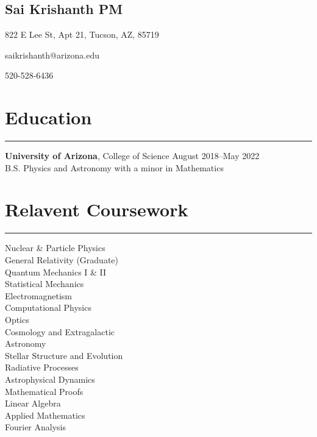 \documentclass[11pt]{article}
\newcommand{\name}[1]{\begin{center}\section*{\huge #1}\end{center}}
\newcommand{\topinfo}[1]{\begin{center}\vspace{-0.2cm}#1\vspace{-0.2cm}\end{center}}
\newcommand{\resumesection}[1]{\vspace{-0.2cm}\section*{#1}\vspace{-0.2cm}\hrule\vspace{0.2cm}}
\begin{document}
\name{Sai Krishanth PM}
\topinfo{822 E Lee St, Apt 21, Tucson, AZ, 85719}
\topinfo{saikrishanth@arizona.edu}
\topinfo{520-528-6436}

\resumesection{Education}
\textbf{University of Arizona}, College of Science \hfill August 2018--May 2022
\\ B.S. Physics and Astronomy with a minor in Mathematics 

\resumesection{Relavent Coursework}
\begin{multicols}{3}
\noindent Nuclear \& Particle Physics \\
General Relativity (Graduate) \\
Quantum Mechanics I \& II\\
Statistical Mechanics \\
Electromagnetism \\
Computational Physics \\
Optics \\
Cosmology and Extragalactic \\
Astronomy \\
Stellar Structure and Evolution \\
Radiative Processes\\
Astrophysical Dynamics\\
Mathematical Proofs\\
Linear Algebra\\
Applied Mathematics\\
Fourier Analysis\\
\end{multicols}
\end{document}
